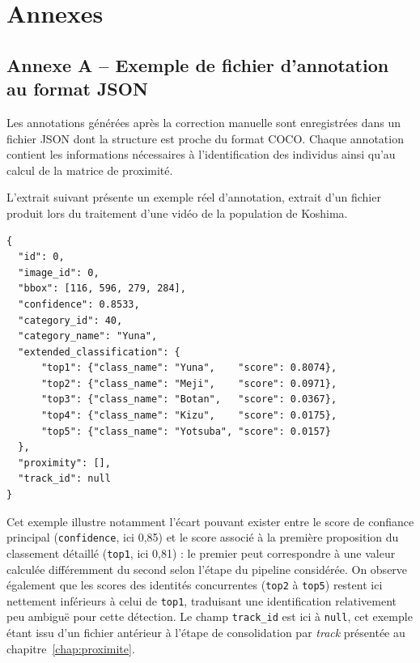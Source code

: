 \documentclass[11pt,a4paper]{report}
\begin{document}

\appendix

\chapter*{Annexes}

\section*{Annexe A -- Exemple de fichier d'annotation au format JSON}

Les annotations générées après la correction manuelle sont enregistrées
dans un fichier JSON dont la structure est proche du format COCO. Chaque
annotation contient les informations nécessaires à l'identification des
individus ainsi qu'au calcul de la matrice de proximité.

L'extrait suivant présente un exemple réel d'annotation, extrait d'un
fichier produit lors du traitement d'une vidéo de la population de
Koshima.

\begin{verbatim}
{
  "id": 0,
  "image_id": 0,
  "bbox": [116, 596, 279, 284],
  "confidence": 0.8533,
  "category_id": 40,
  "category_name": "Yuna",
  "extended_classification": {
      "top1": {"class_name": "Yuna",    "score": 0.8074},
      "top2": {"class_name": "Meji",    "score": 0.0971},
      "top3": {"class_name": "Botan",   "score": 0.0367},
      "top4": {"class_name": "Kizu",    "score": 0.0175},
      "top5": {"class_name": "Yotsuba", "score": 0.0157}
  },
  "proximity": [],
  "track_id": null
}
\end{verbatim}

Cet exemple illustre notamment l'écart pouvant exister entre le score de
confiance principal (\texttt{confidence}, ici 0,85) et le score associé à
la première proposition du classement détaillé (\texttt{top1}, ici
0,81) : le premier peut correspondre à une valeur calculée différemment
du second selon l'étape du pipeline considérée. On observe également
que les scores des identités concurrentes (\texttt{top2} à
\texttt{top5}) restent ici nettement inférieurs à celui de
\texttt{top1}, traduisant une identification relativement peu ambiguë
pour cette détection. Le champ \texttt{track\_id} est ici à
\texttt{null}, cet exemple étant issu d'un fichier antérieur à l'étape
de consolidation par \emph{track} présentée au
chapitre~\ref{chap:proximite}.
\end{document}
